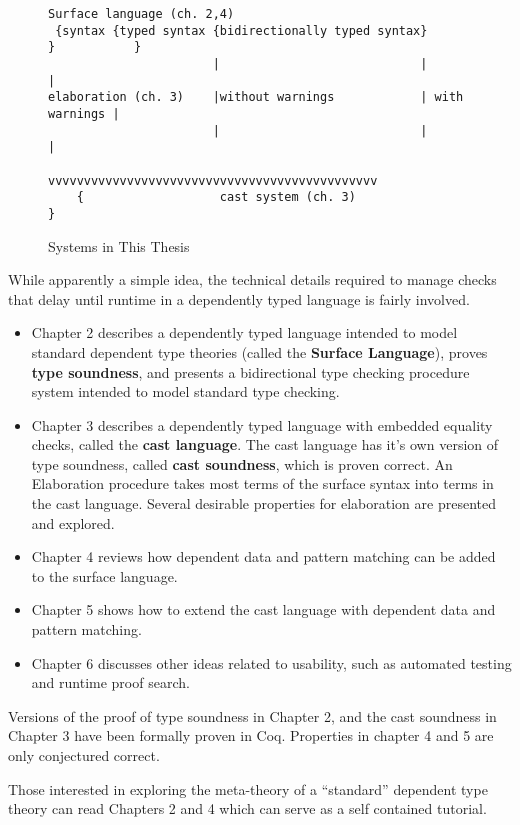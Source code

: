 \begin{figure}
\begin{lstlisting}
Surface language (ch. 2,4)
 {syntax {typed syntax {bidirectionally typed syntax}       }           }
                       |                            |               |
elaboration (ch. 3)    |without warnings            | with warnings |
                       |                            |               |
                       vvvvvvvvvvvvvvvvvvvvvvvvvvvvvvvvvvvvvvvvvvvvvv
    {                   cast system (ch. 3)                             }

\end{lstlisting}


\caption{Systems in This Thesis}
\label{fig:intro-thesis-workflow-1}
\end{figure}

While apparently a simple idea, the technical details required to
manage checks that delay until runtime in a dependently typed language
is fairly involved. 

\begin{itemize}
\item Chapter 2 describes a dependently typed language intended to model
standard dependent type theories (called the\textbf{ Surface Language}),
proves \textbf{type soundness}, and presents a bidirectional type
checking procedure system intended to model standard type checking. 
\item Chapter 3 describes a dependently typed language with embedded equality
checks, called the \textbf{cast language}. The cast language has it's
own version of type soundness, called \textbf{cast soundness}, which
is proven correct. An Elaboration procedure takes most terms of the
surface syntax into terms in the cast language. Several desirable
properties for elaboration are presented and explored.
\item Chapter 4 reviews how dependent data and pattern matching can be added
to the surface language.
\item Chapter 5 shows how to extend the cast language with dependent data
and pattern matching. 
\item Chapter 6 discusses other ideas related to usability, such as automated
testing and runtime proof search.
\end{itemize}
Versions of the proof of type soundness in Chapter 2, and the cast
soundness in Chapter 3 have been formally proven in Coq. Properties
in chapter 4 and 5 are only conjectured correct.

Those interested in exploring the meta-theory of a ``standard''
dependent type theory can read Chapters 2 and 4 which can serve as
a self contained tutorial.

% 
% 

